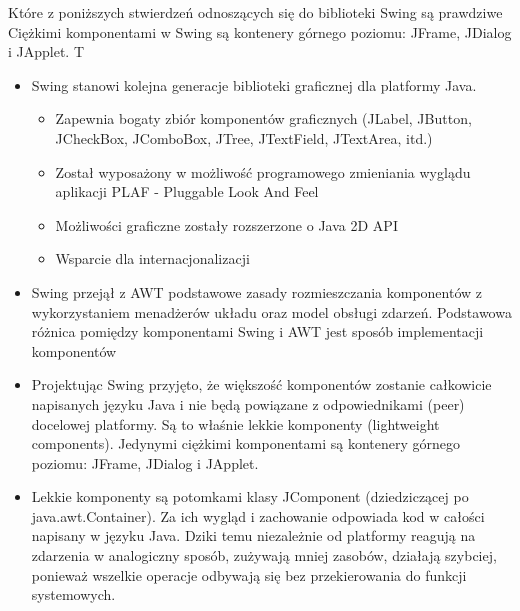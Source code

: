 \answer
{Które z poniższych stwierdzeń odnoszących się do biblioteki Swing są prawdziwe}
{Ciężkimi komponentami w Swing są kontenery górnego poziomu: JFrame, JDialog i JApplet.}
{T}
{\begin{itemize}
\item Swing stanowi kolejna generacje biblioteki graficznej dla platformy Java. 
\begin{itemize}
\item Zapewnia bogaty zbiór komponentów graficznych (JLabel, JButton, JCheckBox, JComboBox, JTree, JTextField, JTextArea, itd.)
\item Został wyposażony w możliwość programowego zmieniania wyglądu aplikacji PLAF - Pluggable Look And Feel
\item Możliwości graficzne zostały rozszerzone o Java 2D API
\item Wsparcie dla internacjonalizacji
\end{itemize}
\item Swing przejął z AWT podstawowe zasady rozmieszczania komponentów z wykorzystaniem menadżerów układu oraz model obsługi zdarzeń. Podstawowa różnica pomiędzy komponentami Swing i AWT jest sposób implementacji komponentów
\item Projektując Swing przyjęto, że większość komponentów zostanie całkowicie napisanych języku Java i nie będą powiązane z odpowiednikami (peer) docelowej platformy. Są to właśnie lekkie komponenty (lightweight components). Jedynymi ciężkimi komponentami są kontenery górnego poziomu: JFrame, JDialog i JApplet.
\item Lekkie komponenty są potomkami klasy JComponent (dziedziczącej po java.awt.Container). Za ich wygląd i zachowanie odpowiada kod w całości napisany w języku Java. Dziki temu niezależnie od platformy reagują na zdarzenia w analogiczny sposób, zużywają mniej zasobów, działają szybciej, ponieważ wszelkie operacje odbywają się bez przekierowania do funkcji systemowych.
\end{itemize}
}
{}

